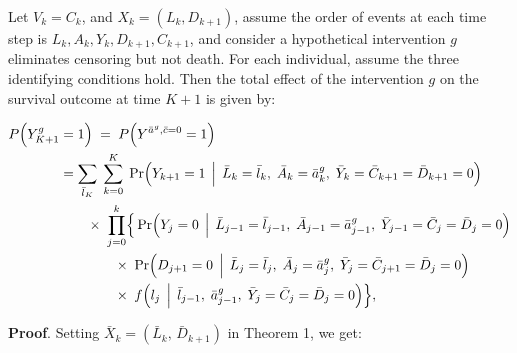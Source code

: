 \begin{tcolorbox}[title=Corollary 2: Total effect: g-formula under elimination of censoring but not death] 

    Let $V_k = C_k$, and $X_k = (L_k,D_{k+1})$, assume the order
    of events at each time step is $L_k, A_k, Y_k, D_{k+1},  C_{k+1}$,
    and consider a hypothetical intervention $g$ 
    eliminates censoring but not death. 
    For each individual, assume the three identifying 
    conditions hold. Then the total effect of the intervention $g$ on the survival outcome at time $K+1$ is given by:
  
    \begin{align*}
        P\Bigl(Y_{K+1}^g &= 1\Bigr) \;=\;
        P\Bigl(Y^{\bar{a}^g,\bar{c}=0} = 1\Bigr) \\
        & = \sum_{\bar{l}_K} \; \sum_{k=0}^{K}\;
        \Pr\Bigl(Y_{k+1} = 1 \,\Bigm|\,
                \bar{L}_k=\bar{l}_k,\;\bar{A}_k=\bar{a}^g_k,\;
                \bar{Y}_k=\bar{C}_{k+1}=\bar{D}_{k+1}=0\Bigr)
        \\
        & \qquad \times \;
        \prod_{j=0}^{k}
        \Bigl\{\,
          \Pr\Bigl(Y_j=0 \,\Bigm|\,
                  \bar{L}_{j-1}=\bar{l}_{j-1},\;\bar{A}_{j-1}=\bar{a}^g_{j-1},\;
                  \bar{Y}_{j-1} = \bar{C}_j=\bar{D}_j = 0\Bigr)
        \\
        &\qquad\qquad \times\;
          \Pr\Bigl(D_{j+1}=0 \,\Bigm|\,
                \bar{L}_{j}=\bar{l}_{j},\;\bar{A}_j=\bar{a}^g_j,\;
                \bar{Y}_j = \bar{C}_{j+1}=\bar{D}_j=0 \Bigr)        \\
        &\qquad\qquad \times\;
          f\Bigl(l_j \,\Bigm|\,
                    \bar{l}_{j-1},\;\bar{a}^g_{j-1},\;
                    \bar{Y}_j=\bar{C}_j=\bar{D}_j=0\Bigr)
        \Bigr\},
    \end{align*}  


\end{tcolorbox}



\textbf{Proof}. Setting $\bar{X}_k = (\bar{L}_k,\,\bar{D}_{k+1})$ in Theorem 1, we get: 

